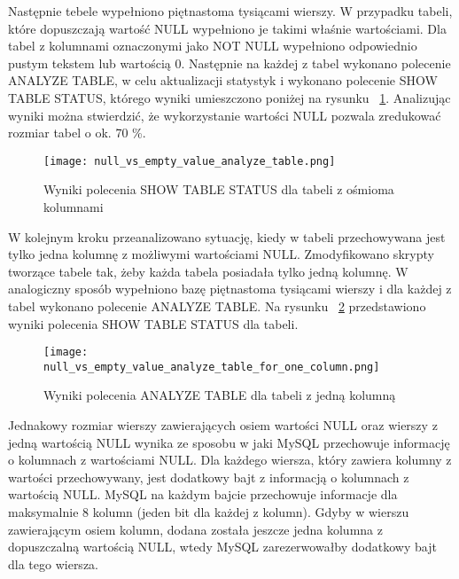Następnie tebele wypełniono piętnastoma tysiącami wierszy. W przypadku tabeli, które dopuszczają wartość NULL wypełniono je takimi właśnie wartościami. Dla tabel z kolumnami oznaczonymi jako NOT NULL wypełniono odpowiednio pustym tekstem lub wartością 0.
Następnie na każdej z tabel wykonano polecenie ANALYZE TABLE, w celu aktualizacji statystyk i wykonano polecenie SHOW TABLE STATUS, którego wyniki umieszczono poniżej na rysunku ~\ref{fig:null_vs_empty_value_analyze_table}.
Analizując wyniki można stwierdzić, że wykorzystanie wartości NULL pozwala zredukować rozmiar tabel o ok. 70 \%.
\begin{figure}
	\centering
	\texttt{[image: null\_vs\_empty\_value\_analyze\_table.png]}
	\caption{Wyniki polecenia SHOW TABLE STATUS dla tabeli z ośmioma kolumnami}
	\label{fig:null_vs_empty_value_analyze_table}
\end{figure}

 W kolejnym kroku przeanalizowano sytuację, kiedy w tabeli przechowywana jest tylko jedna kolumnę z możliwymi wartościami NULL. Zmodyfikowano skrypty tworzące tabele tak, żeby każda tabela posiadała tylko jedną kolumnę. W analogiczny sposób wypełniono bazę piętnastoma tysiącami wierszy i dla każdej z tabel wykonano polecenie ANALYZE TABLE. Na rysunku ~\ref{fig:null_vs_empty_value_analyze_table_for_one_column} przedstawiono wyniki polecenia SHOW TABLE STATUS dla tabeli.

\begin{figure}
	\centering
	\texttt{[image: null\_vs\_empty\_value\_analyze\_table\_for\_one\_column.png]}
	\caption{Wyniki polecenia ANALYZE TABLE dla tabeli z jedną kolumną}
	\label{fig:null_vs_empty_value_analyze_table_for_one_column}
\end{figure}

Jednakowy rozmiar wierszy zawierających osiem wartości NULL oraz wierszy z jedną wartością NULL wynika ze sposobu w jaki MySQL przechowuje informację o kolumnach z wartościami NULL. Dla każdego wiersza, który zawiera kolumny z wartości przechowywany, jest dodatkowy bajt z informacją o kolumnach z wartością NULL. MySQL na każdym bajcie przechowuje informacje dla maksymalnie 8 kolumn (jeden bit dla każdej z kolumn). Gdyby w wierszu zawierającym osiem kolumn, dodana została jeszcze jedna kolumna z dopuszczalną wartością NULL, wtedy MySQL zarezerwowałby dodatkowy bajt dla tego wiersza.


